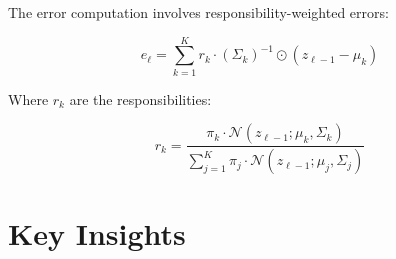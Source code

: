\documentclass{article}
\begin{document}
The error computation involves responsibility-weighted errors:

\begin{equation}
  e_\ell = \sum_{k=1}^K r_k \cdot (\Sigma_k)^{-1} \odot (z_{\ell-1} - \mu_k)
\end{equation}

Where $r_k$ are the responsibilities:

\begin{equation}
  r_k = \frac{\pi_k \cdot \mathcal{N}(z_{\ell-1}; \mu_k, \Sigma_k)}{\sum_{j=1}^K \pi_j \cdot \mathcal{N}(z_{\ell-1}; \mu_j, \Sigma_j)}
\end{equation}

\section{Key Insights}
\end{document}
